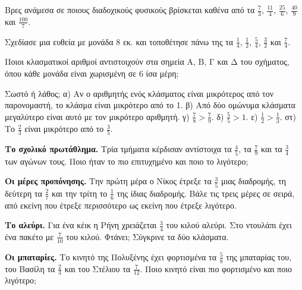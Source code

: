 \ex Βρες ανάμεσα σε ποιους διαδοχικούς φυσικούς βρίσκεται καθένα από τα $\frac{7}{3}$, $\frac{11}{4}$, $\frac{25}{6}$, $\frac{40}{9}$ και $\frac{100}{7}$.

\ex Σχεδίασε μια ευθεία με μονάδα 8 εκ. και τοποθέτησε πάνω της τα $\frac{1}{4}$, $\frac{1}{2}$, $\frac{5}{4}$, $\frac{3}{2}$ και $\frac{7}{4}$.

\ex Ποιοι κλασματικοί αριθμοί αντιστοιχούν στα σημεία Α, Β, Γ και Δ του σχήματος, όπου κάθε μονάδα είναι χωρισμένη σε 6 ίσα μέρη;\par
\begin{center}
\end{center}

\ex Σωστό ή λάθος; α) Αν ο αριθμητής ενός κλάσματος είναι μικρότερος από τον παρονομαστή, το κλάσμα είναι μικρότερο από το 1. \quad β) Από δύο ομώνυμα κλάσματα μεγαλύτερο είναι αυτό με τον μικρότερο αριθμητή. \quad γ) $\frac{7}{8}>\frac{7}{9}$. \quad δ) $\frac{5}{5}>1$. \quad ε) $\frac{1}{2}>\frac{1}{3}$. \quad στ) Το $\frac{2}{3}$ είναι μικρότερο από το $\frac{3}{5}$.


\ex \textbf{Το σχολικό πρωτάθλημα.} Τρία τμήματα κέρδισαν αντίστοιχα τα $\frac{4}{5}$, τα $\frac{7}{9}$ και τα $\frac{3}{4}$ των αγώνων τους. Ποιο ήταν το πιο επιτυχημένο και ποιο το λιγότερο;

\ex \textbf{Οι μέρες προπόνησης.} Την πρώτη μέρα ο Νίκος έτρεξε τα $\frac{3}{5}$ μιας διαδρομής, τη δεύτερη τα $\frac{2}{7}$ και την τρίτη το $\frac{1}{6}$ της ίδιας διαδρομής. Βάλε τις τρεις μέρες σε σειρά, από εκείνη που έτρεξε περισσότερο ως εκείνη που έτρεξε λιγότερο.

\ex \textbf{Το αλεύρι.} Για ένα κέικ η Ρήνη χρειάζεται $\frac{3}{4}$ του κιλού αλεύρι. Στο ντουλάπι έχει ένα πακέτο με $\frac{7}{10}$ του κιλού. Φτάνει; Σύγκρινε τα δύο κλάσματα.

\ex \textbf{Οι μπαταρίες.} Το κινητό της Πολυξένης έχει φορτισμένα τα $\frac{5}{8}$ της μπαταρίας του, του Βασίλη τα $\frac{2}{3}$ και του Στέλιου τα $\frac{7}{12}$. Ποιο κινητό είναι πιο φορτισμένο και ποιο λιγότερο;

